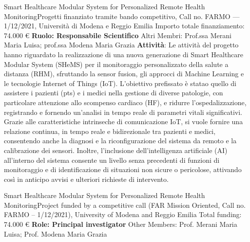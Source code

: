 
{Smart Healthcare Modular System for Personalized Remote Health Monitoring}{Progetti finanziato tramite bando competitivo, Call no. FARMO --- 1/12/2021, Università di Modena e Reggio Emilia}
{\newline Importo totale finanziamento: 74.000 €
    \newline \textbf{Ruolo: Responsabile Scientifico}\newline
    Altri Membri: Prof.ssa Merani Maria Luisa; prof.ssa Modena Maria Grazia
    }
{\textbf{Attività}: Le attività del progetto hanno riguardato la realizzazione di una nuova generazione di Smart Healthcare Modular System (SHeMS) per il monitoraggio personalizzato della salute a distanza (RHM), sfruttando la sensor fusion, gli approcci di Machine Learning e le tecnologie Internet of Things (IoT). L'obiettivo prefissato è statao quello di assistere i pazienti (pts) e i medici nella gestione di diverse patologie, con particolare attenzione allo scompenso cardiaco (HF), e ridurre l'ospedalizzazione, registrando e fornendo un'analisi in tempo reale di parametri vitali significativi. Grazie alle caratteristiche intrinseche di comunicazione IoT, si vuole fornire una relazione continua, in tempo reale e bidirezionale tra pazienti e medici, consentendo anche la diagnosi e la riconfigurazione del sistema da remoto e la calibrazione dei sensori. Inoltre, l'inclusione dell'intelligenza artificiale (AI) all'interno del sistema consente un livello senza precedenti di funzioni di monitoraggio e di identificazione di situazioni non sicure o pericolose, attivando così in anticipo avvisi e ulteriori richieste di intervento.}

{Smart Healthcare Modular System for Personalized Remote Health Monitoring}{Project funded by a competitive call (FAR Mission Oriented, Call no. FARMO -- 1/12/2021), University of Modena and Reggio Emilia}
{\newline
    Total funding: 74.000 €\newline
    \textbf{Role: Principal investigator}\newline
    Other Members: Prof. Merani Maria Luisa; Prof. Modena Maria Grazia}{}

